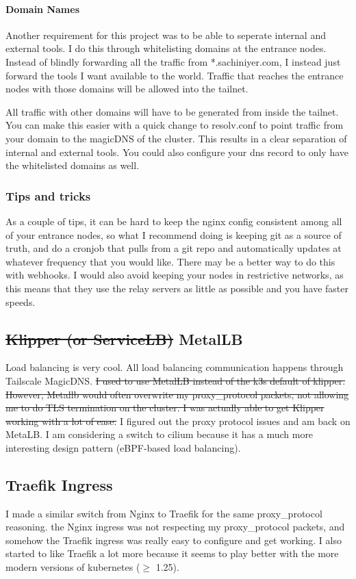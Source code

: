 \documentclass[12pt]{article}
\begin{document}
\paragraph{Domain Names}
Another requirement for this project was to be able to seperate internal and external tools. I do this through whitelisting domains at the entrance nodes. Instead of blindly forwarding all the traffic from *.sachiniyer.com, I instead just forward the tools I want available to the world. Traffic that reaches the entrance nodes with those domains will be allowed into the tailnet.

All traffic with other domains will have to be generated from inside the tailnet. You can make this easier with a quick change to resolv.conf to point traffic from your domain to the magicDNS of the cluster. This results in a clear separation of internal and external tools. You could also configure your dns record to only have the whitelisted domains as well.


\subsubsection{Tips and tricks}
As a couple of tips, it can be hard to keep the nginx config consistent among all of your entrance nodes, so what I recommend doing is keeping git as a source of truth, and do a cronjob that pulls from a git repo and automatically updates at whatever frequency that you would like. There may be a better way to do this with webhooks. I would also avoid keeping your nodes in restrictive networks, as this means that they use the relay servers as little as possible and you have faster speeds.

\subsection{\sout{Klipper (or ServiceLB)} MetalLB}
Load balancing is very cool. All load balancing communication happens through Tailscale MagicDNS. \sout{I used to use MetalLB instead of the k3s default of klipper. However, Metallb would often overwrite my proxy\_protocol packets, not allowing me to do TLS termination on the cluster. I was actually able to get Klipper working with a lot of ease.} I figured out the proxy protocol issues and am back on MetaLB. I am considering a switch to cilium because it has a much more interesting design pattern (eBPF-based load balancing).

\subsection{Traefik Ingress}
I made a similar switch from Nginx to Traefik for the same proxy\_protocol reasoning. the Nginx ingress was not respecting my proxy\_protocol packets, and somehow the Traefik ingress was really easy to configure and get working. I also started to like Traefik a lot more because it seems to play better with the more modern versions of kubernetes ($\ge$ 1.25).
\end{document}
